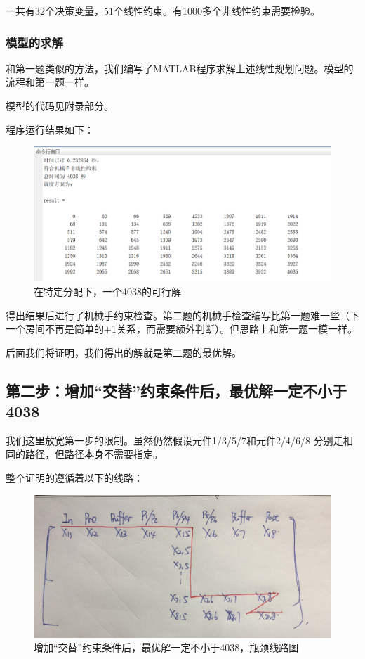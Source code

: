 \documentclass{ctexart}
\begin{document}
{{		一共有32个决策变量，51个线性约束。有1000多个非线性约束需要检验。

		\subsubsection{模型的求解}
		{
			和第一题类似的方法，我们编写了MATLAB程序求解上述线性规划问题。模型的流程和第一题一样。
			
			模型的代码见附录部分。
			
			程序运行结果如下：
			
			\begin{figure}[H]
				\centering
				\includegraphics[width = 0.9\linewidth]{P2Result.PNG}
				\caption{在特定分配下，一个4038的可行解}
			\end{figure}
		
			得出结果后进行了机械手约束检查。第二题的机械手检查编写比第一题难一些（下一个房间不再是简单的+1关系，而需要额外判断）。但思路上和第一题一模一样。
			
			后面我们将证明，我们得出的解就是第二题的最优解。
		}
		
      
    }

    \subsection{第二步：增加“交替”约束条件后，最优解一定不小于4038}
    {
        我们这里放宽第一步的限制。虽然仍然假设元件1/3/5/7和元件2/4/6/8 分别走相同的路径，但路径本身不需要指定。
        
        整个证明的遵循着以下的线路：
        
        \begin{figure}[H]
        	\centering
        	\includegraphics[width = 0.9\linewidth]{proof1.jpg}
        	\caption{增加“交替”约束条件后，最优解一定不小于4038，瓶颈线路图}
        \end{figure}
        
}}
\end{document}
